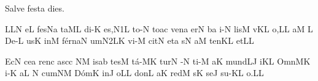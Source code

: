 
\beginhymn Salve festa dies.

\def\beginverse{\begingroup
                       \def\\{\mycr}
                       \pretolerance=10000
                       \raggedright
                       \parskip=5pt
                       \parindent10mm
                       \vskip-\parskip
                       \itlyrics}
\def\endverse{\endgroup}

\nosolesmescustos
{}
\Internote
\initiumgregorianum
{}%
\punctum L\spatiumparvum\pes LN\egn
\sgn {}e{}\punctum L\egn
\spatium
\sgn f{e}s\pes Na\egn
\sgn ta{}\clivis ML\egn
\spatium
\sgn di-\punctum K\egn
\sgn {}e{s,}\episem N1\punctum L\egn
\spatium
\divisiominima
\spatium
\sgn t{o}-\punctum N\egn
\sgn to{}\pes ac\egn
\spatium
\sgn ven\punctum a\egn
\sgn {}er\punctum N\egn
{}b\punctum a\egn
\sgn {}i-\punctum N\egn
\sgn lis\punctum M\egn
\spatium
\sgn {}{\ae}v\pes KL\egn
\sgn {}o,\punctum L\augmentum L\egn
\spatium
\divisiominor
\spatium
{}a{}\punctum M\egn
\spatium
\custos L
\lineaproxima
\sgn D{e}-\punctum L\egn
\sgn {}us\punctum K\egn
\spatium
\sgn {}in\punctum M\egn
\sgn f{\'e}{rn}\clivis aN\egn
\sgn {}um\episem N2\clivis LK\egn
\spatium
\divisiominima
\spatium
\sgn v{i}-\punctum M\egn
\sgn cit\punctum N\egn
\spatium
\sgn {}et\punctum a\egn
\spatium
{}s\punctum N\egn
{}a{}\punctum M\egn
\spatium
\sgn t{e}n\pes KL\egn
\sgn {}et\punctum L\augmentum L\egn
\Finisgregoriana


\smallskip

\initiumgregorianum
{}%
\sgn {}Ec\punctum N\egn
\sgn ce{}\punctum a\egn
\spatium
\sgn ren\punctum c\egn
\sgn {}a{sc}\punctum c\egn
{}\clivis NM\egn
\sgn {}is\punctum a\augmentum b\egn
\spatium
\divisiominima
\spatium
\sgn tes\punctum M\egn
\sgn t{\'a}-\clivis MK\egn
\sgn tur\punctum N\egn
\spatium
{}-\punctum N\egn
\sgn ti-\punctum M\egn
\sgn {}a{}\punctum K\egn
\spatium
\sgn m{u}{nd}\clivis LJ\egn
\sgn {}i{}\punctum K\augmentum L\egn
\spatium
\divisiominor
\spatium
\sgn {}O{mn}\clivis MK\egn
\sgn {}i-\punctum K\egn
\sgn {}a{}\punctum L\egn
\spatium
\custos N
\lineaproxima
\sgn cum\clivis NM\egn
\spatium
\sgn D{\'o}m\punctum K\egn
\sgn {}in\punctum J\egn
\sgn {}o{}\punctum L\augmentum L\egn
\spatium
\divisiominima
\spatium
\sgn d{o}n\punctum L\egn
\sgn {}a{}\punctum K\egn
\spatium
\sgn red\punctum M\egn
\sgn {}{\'\i}s\punctum K\egn
\sgn se{}\punctum J\egn
\spatium
\sgn s{u}-\pes KL\egn
\sgn {}o{.}\punctum L\augmentum L\egn
\Finisgregoriana


